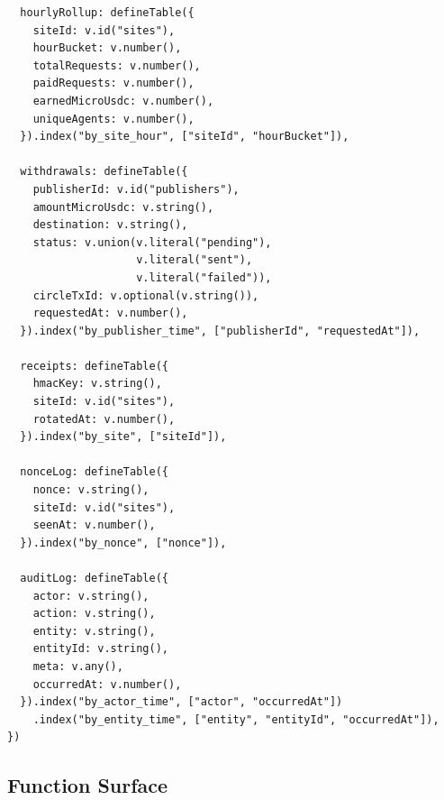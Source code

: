 \documentclass[11pt,a4paper]{article}
\begin{document}
\begin{lstlisting}
  hourlyRollup: defineTable({
    siteId: v.id("sites"),
    hourBucket: v.number(),
    totalRequests: v.number(),
    paidRequests: v.number(),
    earnedMicroUsdc: v.number(),
    uniqueAgents: v.number(),
  }).index("by_site_hour", ["siteId", "hourBucket"]),

  withdrawals: defineTable({
    publisherId: v.id("publishers"),
    amountMicroUsdc: v.string(),
    destination: v.string(),
    status: v.union(v.literal("pending"),
                    v.literal("sent"),
                    v.literal("failed")),
    circleTxId: v.optional(v.string()),
    requestedAt: v.number(),
  }).index("by_publisher_time", ["publisherId", "requestedAt"]),

  receipts: defineTable({
    hmacKey: v.string(),
    siteId: v.id("sites"),
    rotatedAt: v.number(),
  }).index("by_site", ["siteId"]),

  nonceLog: defineTable({
    nonce: v.string(),
    siteId: v.id("sites"),
    seenAt: v.number(),
  }).index("by_nonce", ["nonce"]),

  auditLog: defineTable({
    actor: v.string(),
    action: v.string(),
    entity: v.string(),
    entityId: v.string(),
    meta: v.any(),
    occurredAt: v.number(),
  }).index("by_actor_time", ["actor", "occurredAt"])
    .index("by_entity_time", ["entity", "entityId", "occurredAt"]),
})
\end{lstlisting}

\subsection{Function Surface}
\end{document}
